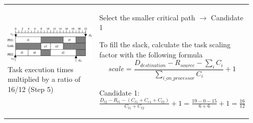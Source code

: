 \begin{longtable}{p{0.4\linewidth}p{0.55\linewidth}}
			\includegraphics[scale=0.35]{./pictures/voltage_scheduling_2.png} \newline
				Task execution times multiplied by a ratio of 16/12 (Step 5)			
			&
				\vspace{-90pt}
				\begin{compactenum}	
					\setcounter{enumi}{2}
					\item Select the smaller critical path $\rightarrow$ Candidate 1
					\item To fill the slack, calculate the task scaling factor with the following formula 
					\begin{equation*}
						scale=\frac{D_{destination}-R_{source}-\sum_{i}C_i}{\sum_{i\_on\_processor}C_i}+1
					\end{equation*}
					\begin{compactitem}
						\item Candidate 1: $\frac{D_{t2}-R_{t1}-(C_{t1}+C_{e1}+C_{t2})}{C_{t1}+C_{t2}}+1=\frac{19-0-15}{6+6}+1=\frac{16}{12}$
					\end{compactitem}				
				\end{compactenum}\\				
				

\end{longtable}
